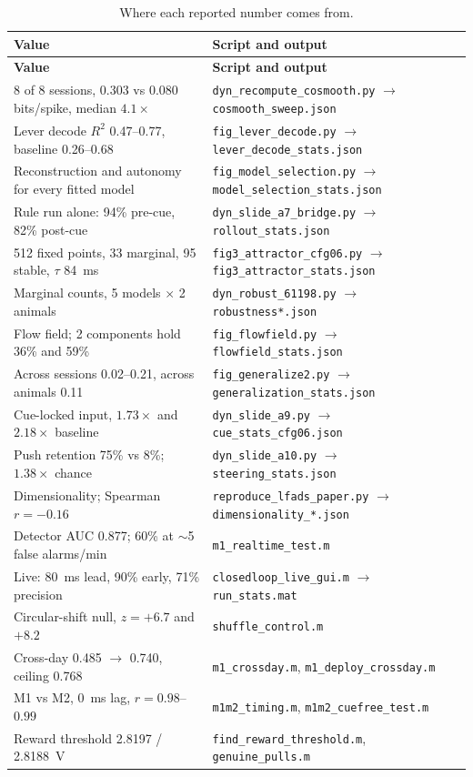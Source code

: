 \documentclass[11pt]{article}
\begin{document}
\begingroup\small
\begin{longtable}{@{}p{}p{}@{}}
\caption{Where each reported number comes from.}\label{tab:prov}\\
\toprule
\textbf{Value} & \textbf{Script and output} \\
\midrule
\endfirsthead
\toprule
\textbf{Value} & \textbf{Script and output} \\
\midrule
\endhead
8 of 8 sessions, 0.303 vs 0.080 bits/spike, median $4.1\times$ &
\texttt{dyn\_recompute\_cosmooth.py} $\to$ \texttt{cosmooth\_sweep.json} \\
Lever decode $R^2$ 0.47--0.77, baseline 0.26--0.68 &
\texttt{fig\_lever\_decode.py} $\to$ \texttt{lever\_decode\_stats.json} \\
Reconstruction and autonomy for every fitted model &
\texttt{fig\_model\_selection.py} $\to$ \texttt{model\_selection\_stats.json} \\
Rule run alone: 94\% pre-cue, 82\% post-cue &
\texttt{dyn\_slide\_a7\_bridge.py} $\to$ \texttt{rollout\_stats.json} \\
512 fixed points, 33 marginal, 95 stable, $\tau$ 84~ms &
\texttt{fig3\_attractor\_cfg06.py} $\to$ \texttt{fig3\_attractor\_stats.json} \\
Marginal counts, 5 models $\times$ 2 animals &
\texttt{dyn\_robust\_61198.py} $\to$ \texttt{robustness*.json} \\
Flow field; 2 components hold 36\% and 59\% &
\texttt{fig\_flowfield.py} $\to$ \texttt{flowfield\_stats.json} \\
Across sessions 0.02--0.21, across animals 0.11 &
\texttt{fig\_generalize2.py} $\to$ \texttt{generalization\_stats.json} \\
Cue-locked input, $1.73\times$ and $2.18\times$ baseline &
\texttt{dyn\_slide\_a9.py} $\to$ \texttt{cue\_stats\_cfg06.json} \\
Push retention 75\% vs 8\%; $1.38\times$ chance &
\texttt{dyn\_slide\_a10.py} $\to$ \texttt{steering\_stats.json} \\
Dimensionality; Spearman $r = -0.16$ &
\texttt{reproduce\_lfads\_paper.py} $\to$ \texttt{dimensionality\_*.json} \\
Detector AUC 0.877; 60\% at $\sim$5 false alarms/min &
\texttt{m1\_realtime\_test.m} \\
Live: 80~ms lead, 90\% early, 71\% precision &
\texttt{closedloop\_live\_gui.m} $\to$ \texttt{run\_stats.mat} \\
Circular-shift null, $z = +6.7$ and $+8.2$ &
\texttt{shuffle\_control.m} \\
Cross-day 0.485 $\to$ 0.740, ceiling 0.768 &
\texttt{m1\_crossday.m}, \texttt{m1\_deploy\_crossday.m} \\
M1 vs M2, 0~ms lag, $r = 0.98$--$0.99$ &
\texttt{m1m2\_timing.m}, \texttt{m1m2\_cuefree\_test.m} \\
Reward threshold 2.8197 / 2.8188~V &
\texttt{find\_reward\_threshold.m}, \texttt{genuine\_pulls.m} \\
\bottomrule
\end{longtable}
\endgroup
\end{document}
